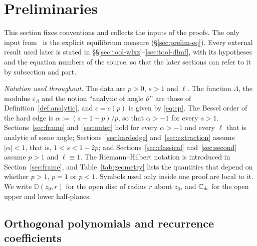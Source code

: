 
\section{Preliminaries}\label{sec:prelim}

This section fixes conventions and collects the inputs of the proofs. The only input from~\cite{Paper1} is the explicit equilibrium measure (\S\ref{sec:prelim-eq}). Every external result used later is
stated in \S\S\ref{sec:tool-wlxz}--\ref{sec:tool-dlmf}, with its hypotheses and the equation numbers of the source,
so that the later sections can refer to it by subsection and part.

\emph{Notation used throughout.} The data are $p>0$, $s>1$ and $\ell$. The function $\Lambda$, the modulus
$\varepsilon_\Lambda$ and the notion ``analytic of angle $\vartheta$'' are those of Definition~\ref{def:analytic}, and
$c=c(p)$ is given by \eqref{eq:cp}. The Bessel order of the hard edge is $\alpha:=(s-1-p)/p$, so that $\alpha>-1$ for
every $s>1$. Sections~\ref{sec:frame} and~\ref{sec:outer} hold for every $\alpha>-1$ and every $\ell$ that is analytic
of some angle; Sections~\ref{sec:hardedge} and~\ref{sec:extraction} assume $|\alpha|<1$, that is, $1<s<1+2p$; and
Sections~\ref{sec:classical} and~\ref{sec:second} assume $p>1$ and $\ell\equiv1$. The Riemann--Hilbert notation is
introduced in Section~\ref{sec:frame}, and Table~\ref{tab:geometry} lists the quantities that depend on whether $p>1$,
$p=1$ or $p<1$. Symbols used only inside one proof are local to it. We write $\mathbb D(z_0,r)$ for the open disc of
radius $r$ about $z_0$, and $\mathbb{C}_\pm$ for the open upper and lower half-planes.

\subsection{Orthogonal polynomials and recurrence coefficients}\label{sec:prelim-op}

